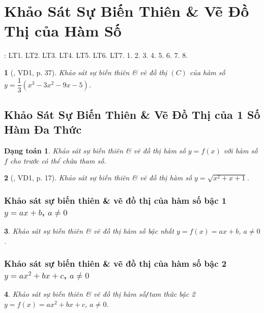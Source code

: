 \documentclass{article}
\newtheorem{baitoan}{}
\newtheorem{dangtoan}{Dạng toán}
\begin{document}

\section{Khảo Sát Sự Biến Thiên \& Vẽ Đồ Thị của Hàm Số}
\cite[Chap. I, \S4, pp. 28--44]{SGK_Toan_12_CD_tap_1}: LT1. LT2. LT3. LT4. LT5. LT6. LT7. 1. 2. 3. 4. 5. 6. 7. 8.

\begin{baitoan}[\cite{SGK_Toan_12_giai_tich_nang_cao}, VD1, p. 37]
	Khảo sát sự biến thiên \& vẽ đồ thị $(C)$ của hàm số $y = \dfrac{1}{3}(x^3 - 3x^2 - 9x - 5)$.
\end{baitoan}

\subsection{Khảo Sát Sự Biến Thiên \& Vẽ Đồ Thị của 1 Số Hàm Đa Thức}

\begin{dangtoan}
	Khảo sát sự biến thiên \& vẽ đồ thị hàm số $y = f(x)$ với hàm số $f$ cho trước có thể chứa tham số.
\end{dangtoan}

\begin{baitoan}[\cite{TLCT_giai_tich_12}, VD1, p. 17]
	Khảo sát sự biến thiên \& vẽ đồ thị hàm số $y = \sqrt{x^2 + x + 1}$.
\end{baitoan}

\subsubsection{Khảo sát sự biến thiên \& vẽ đồ thị của hàm số bậc 1 $y = ax + b$, $a\ne 0$}

\begin{baitoan}
	Khảo sát sự biến thiên \& vẽ đồ thị hàm số bậc nhất $y = f(x) = ax + b$, $a\ne 0$.
\end{baitoan}

\subsubsection{Khảo sát sự biến thiên \& vẽ đồ thị của hàm số bậc 2 $y = ax^2 + bx + c$, $a\ne 0$}

\begin{baitoan}
	Khảo sát sự biến thiên \& vẽ đồ thị hàm số\emph{\texttt{/}}tam thức bậc 2 $y = f(x) = ax^2 + bx + c$, $a\ne 0$.
\end{baitoan}
\end{document}

